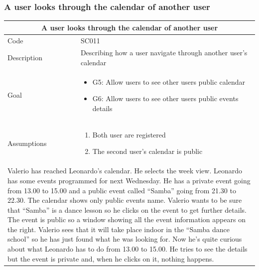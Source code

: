 \documentclass[10pt,a4paper,titlepage]{article}
\begin{document}
\subsubsection{A user looks through the calendar of another user}
\begin{tabular}{| p{3cm} | p{10cm} |}
\hline \multicolumn{2}{|c|}{\textbf{A user looks through the calendar of another user}} \\ 
\hline Code & SC011 \\ 
\hline Description & Describing how a user navigate through another user's calendar\\
\hline Goal & \begin{itemize}\item G5: Allow users to see other users public calendar\item G6: Allow users to see other users public events details\end{itemize}\\
\hline Assumptions & \begin{enumerate}
\item Both user are registered
\item The second user's calendar is public
\end{enumerate} \\
\hline \multicolumn{2}{|p{13cm}|}{Valerio has reached Leonardo’s calendar. He selects the week view. Leonardo has some events programmed for next Wednesday. He has a private event going from 13.00 to 15.00 and a public event called “Samba” going from 21.30 to 22.30. The calendar shows only public events name. Valerio wants to be sure that “Samba” is a dance lesson so he clicks on the event to get further details. The event is public so a window showing all the event information appears on the right. Valerio sees that it will take place indoor in the “Samba dance school” so he has just found what he was looking for. Now he’s quite curious about what Leonardo has to do from 13.00 to 15.00. He tries to see the details but the event is private and, when he clicks on it, nothing happens.}\\
\hline
\end{tabular}
\end{document}
